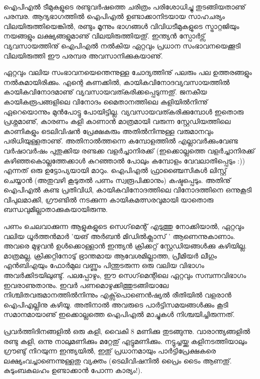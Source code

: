 ﻿
\enlargethispage{3\baselineskip}
\vskip 2pt

‌\hspace*{2em}\parbox{8.5cm}{
\small
ഐപിഎല്‍ ടീമുകളുടെ രണ്ടുവര്‍ഷത്തെ ചരിത്രം പരിശോധിച്ചു തുടങ്ങിയതാണു് പരമ്പര. ആദ്യഭാഗത്തില്‍ ഐപിഎല്‍ 
ഉണ്ടാക്കാനിടയായ സാഹചര്യം വിലയിരുത്തിയെങ്കില്‍, രണ്ടും മൂന്നും ഭാഗങ്ങള്‍ വിവിധടീമുകളുടെ സ്ട്രാറ്റജിയും നയങ്ങളും 
ലക്ഷ്യങ്ങളുമാണു് വിലയിരുത്തിയതു്. ഇന്ത്യന്‍ സ്പോര്‍ട്സ് വ്യവസായത്തിനു് ഐപിഎല്‍ നല്‍കിയ ഏറ്റവും 
പ്രധാന സംഭാവനയെക്കൂടി വിലയിരുത്തി ഈ പരമ്പര അവസാനിക്കുകയാണു്.
}

\vskip 12pt
\hspace*{-1.5em}ഏറ്റവും വലിയ സംഭാവനയെന്തെന്നുള്ള ചോദ്യത്തിനു് പലരും പല ഉത്തരങ്ങളും നല്‍കുമായിരിക്കും. എന്റെ കണക്കില്‍, 
കായികവിനോദവ്യവസായത്തില്‍ കായികവിനോദമാണു് വ്യവസായവത്കരിക്കപ്പെടുന്നതു്. ജനകീയ കായികരൂപങ്ങളിലെ 
വിനോദം മൈതാനത്തിലെ കളിയില്‍നിന്നു് ഏറെയൊന്നും മുന്‍പോട്ടു പോയിട്ടില്ല. വ്യവസായവത്കരിക്കുമ്പോള്‍ ഇതൊരു 
പ്രശ്നമാണു്, കാരണം കളി കാണാന്‍ മാത്രമായി വരുന്ന സ്റ്റേഡിയത്തിലെ കാണികളും ടെലിവിഷന്‍ പ്രേക്ഷകരും അതില്‍നിന്നുള്ള വരുമാനവും പരിധിയുള്ളതാണു്. അതിനാല്‍ത്തന്നെ കമ്പോളത്തില്‍ എല്ലാവര്‍ക്കുംവേണ്ട വര്‍ഷാവര്‍ഷം പുതുക്കിയ രണ്ടക്ക വളര്‍ച്ചാനിരക്ക് 
(ഇക്കൊല്ലത്തെ വളര്‍ച്ചാനിരക്ക് കഴിഞ്ഞകൊല്ലത്തേക്കാള്‍ കുറഞ്ഞാല്‍ പോലും കമ്പോളം 
വേവലാതിപ്പെടും :)) എന്നത് ഒരു ഉട്ടോപ്യയായി മാറും. ഐപിഎല്‍ ഫ്രാഞ്ചൈസികള്‍ ലിസ്റ്റ് ചെയ്യാന്‍ (അതുവഴി കൂടുതല്‍ 
പണം സ്വരൂപിക്കാനും) കഷ്ടപ്പെടും. അതിനു് ഐപിഎല്‍ കണ്ട പ്രതിവിധി, കായികവിനോദത്തിലെ വിനോദത്തിനെ ഒന്നുകൂടി വിപുലമാക്കി, ഗ്രൗണ്ടില്‍ നടക്കുന്ന കായികമത്സരവുമായി യാതൊരു ബന്ധവുമില്ലാതാക്കുകയായിരുന്നു.

പണം ചെലവാക്കുന്ന ആളുകളുടെ സെഗ്‌മെന്റ് എടുത്തു നോക്കിയാല്‍, ഏറ്റവും വലിയ ധൂര്‍ത്തന്‍മാര്‍ 'യങ് അര്‍ബന്‍ 
മിഡില്‍ക്ലാസ് ' ആണെന്നുകാണാം. അവരെ മുഴുവന്‍ ഉള്‍ക്കൊള്ളാന്‍ ഇന്ത്യന്‍ ക്രിക്കറ്റ് സ്റ്റേഡിയങ്ങള്‍ക്കു കഴിയില്ല. മാത്രമല്ല, 
ക്രിക്കറ്റിനോടു് ഭ്രാന്തമായ ആവേശമില്ലാത്ത, പ്രീമിയര്‍ ലീഗും എന്‍ബിഎയും ഫോര്‍മുല വണ്ണും പിന്തുടരുന്ന ഒരു വലിയ വിഭാഗം 
അവര്‍ക്കിടയിലുണ്ടു്. പലപ്പോഴും, ഈ സെഗ്‌മെന്റിലെ ഏറ്റവും സമ്പന്നവിഭാഗം ഇവരാണുതാനും. ഇവര്‍ 
പണമൊഴുക്കിത്തുടങ്ങിയാലേ നിശ്ചിതവരുമാനത്തില്‍നിന്നും എക്സ്‌പൊണെന്‍ഷ്യല്‍ രീതിയില്‍ വളരാന്‍ ഐപിഎല്ലിനു 
കഴിയൂ. അതിനാല്‍ അവരുടെ പാര്‍ട്ടിസമയങ്ങള്‍ക്കും കൂടി സമാനമായാണു് ഇക്കൊല്ലത്തെ ഐപിഎല്‍ മാച്ചുകള്‍ 
നിശ്ചയിച്ചിരുന്നത്.


പ്രവര്‍ത്തിദിനങ്ങളില്‍ ഒരു കളി, വൈകി 8 മണിക്കു തുടങ്ങുന്നു. വാരാന്ത്യങ്ങളില്‍ രണ്ടു കളി, ഒന്നു നാലുമണിക്കും മറ്റേതു് 
എട്ടുമണിക്കും. നട്ടുച്ചയ്ക്കു കളിനടത്തിയാലും ഗ്രൗണ്ടു് നിറയുന്ന ഇന്ത്യയില്‍, ഇതു് പ്രധാനമായും പാര്‍ട്ടിപ്രേക്ഷകരെ ലക്ഷ്യംവച്ചാണെന്നുള്ളതു 
വ്യക്തം (ടെലിവിഷനില്‍ പ്രൈം ടൈം ആണതു്. കുടുംബകലഹം ഉണ്ടാക്കാന്‍ പോന്ന കാര്യം!).

